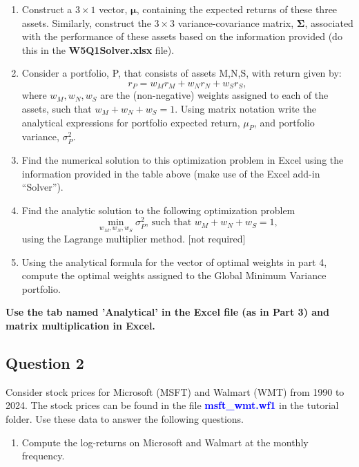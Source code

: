 \documentclass[
  a4paper,
  DIV=11,
  numbers=noendperiod]{scrartcl}
\providecommand{\tightlist}{%
  \setlength{\itemsep}{0pt}\setlength{\parskip}{0pt}}
\begin{document}
\begin{enumerate}
\def\labelenumi{\arabic{enumi}.}
\item
  Construct a \(3\times 1\) vector, \(\boldsymbol{\mu }\), containing
  the expected returns of these three assets. Similarly, construct the
  \(3\times 3\) variance-covariance matrix, \(\boldsymbol{\Sigma }\),
  associated with the performance of these assets based on the
  information provided (do this in the \textbf{W5Q1Solver.xlsx} file).
\item
  Consider a portfolio, P, that consists of assets M,N,S, with return
  given by: \[r_{P}=w_{M}r_{M}+w_{N}r_{N}+w_{S}r_{S},\] where
  \(w_{M},w_{N},w_{S}\) are the (non-negative) weights assigned to each
  of the assets, such that \(w_{M}+w_{N}+w_{S}=1\). Using matrix
  notation write the analytical expressions for portfolio expected
  return, \(\mu _{P}\), and portfolio variance, \(\sigma _{P}^{2}\).
\item
  Find the numerical solution to this optimization problem in Excel
  using the information provided in the table above (make use of the
  Excel add-in ``Solver'').
\item
  Find the analytic solution to the following optimization problem
  \[\min_{w_{M},w_{N},w_{S}}\sigma _{P}^{2}\text{, such that }w_{M}+w_{N}+w_{S}=1,\]
  using the Lagrange multiplier method. {[}not required{]}
\item
  Using the analytical formula for the vector of optimal weights in part
  4, compute the optimal weights assigned to the Global Minimum Variance
  portfolio.
\end{enumerate}

\textcolor{awesome}{\textbf{Use the tab named 'Analytical' in the Excel file (as in Part 3) and matrix multiplication in Excel.}}

\subsection{Question 2}\label{question-2}

Consider stock prices for Microsoft (MSFT) and Walmart (WMT) from 1990
to 2024. The stock prices can be found in the file
\textcolor{blue}{\textbf{msft\_wmt.wf1}} in the tutorial folder. Use
these data to answer the following questions.

\begin{enumerate}
\def\labelenumi{\arabic{enumi}.}
\tightlist
\item
  Compute the log-returns on Microsoft and Walmart at the monthly
  frequency.
\end{enumerate}
\end{document}
